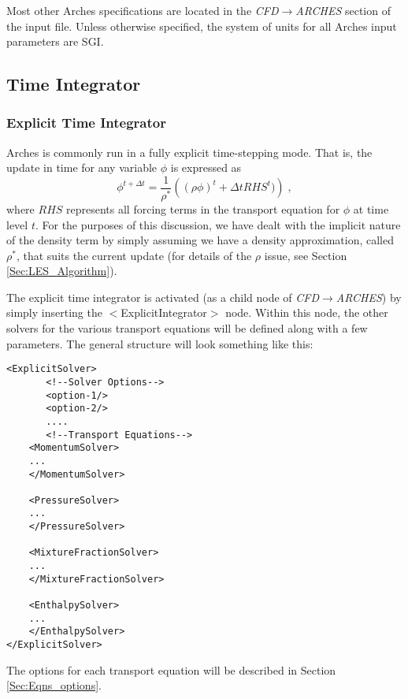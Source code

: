 Most other Arches specifications are located in the {\it CFD$\rightarrow$ARCHES} section of the input file.  Unless otherwise specified, the system of units for all Arches input parameters are SGI. 

 \subsection{Time Integrator}
 \subsubsection{Explicit Time Integrator}
 Arches is commonly run in a fully explicit time-stepping mode.  That is, the update in time for any variable $\phi$ is expressed as
 \begin{equation}
 \phi^{t+\Delta t} = \frac{1}{\rho^*}\left( (\rho\phi)^t +  \Delta tRHS^t) \right) \;,
 \end{equation}
where  $RHS$ represents all forcing terms in the transport equation for $\phi$ at time level $t$.  For the purposes of this discussion, we have dealt with the implicit nature of the density term by simply assuming we have a density approximation, called $\rho^*$, that suits the current update (for details of the $\rho$ issue, see Section  \ref{Sec:LES_Algorithm}).  

The explicit time integrator is activated (as a child node of {\it CFD$\rightarrow$ARCHES}) by simply inserting the $<$ExplicitIntegrator$>$ node.  Within this node,  the other solvers for the various transport equations will be defined along with a few parameters.  The general structure will look something like this:
%
\begin{Verbatim}[fontsize=\footnotesize]
<ExplicitSolver>
	   <!--Solver Options-->
	   <option-1/>
	   <option-2/>
	   ....
	   <!--Transport Equations-->
	<MomentumSolver>
	...
	</MomentumSolver>
	
	<PressureSolver>
	...
	</PressureSolver>
	
	<MixtureFractionSolver>
	...
	</MixtureFractionSolver>
	
	<EnthalpySolver>
	...
	</EnthalpySolver>
</ExplicitSolver>
\end{Verbatim}  
%
The options for each transport equation will be described in Section \ref{Sec:Eqns_options}. 

